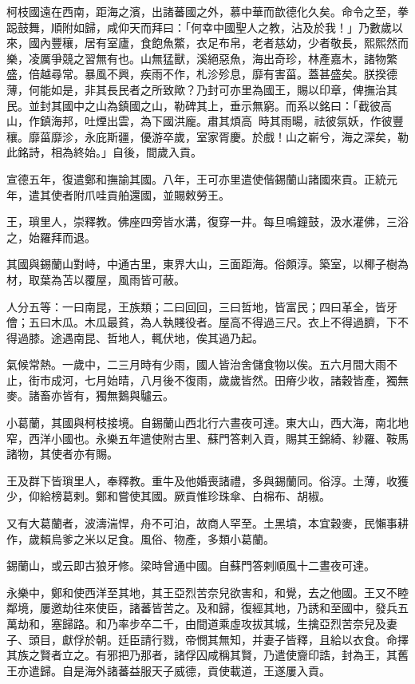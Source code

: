 \begin{pinyinscope}
柯枝國遠在西南，距海之濱，出諸蕃國之外，慕中華而歆德化久矣。命令之至，拳跽鼓舞，順附如歸，咸仰天而拜曰：「何幸中國聖人之教，沾及於我！」乃數歲以來，國內豐穰，居有室廬，食飽魚鱉，衣足布帛，老者慈幼，少者敬長，熙熙然而樂，凌厲爭競之習無有也。山無猛獸，溪絕惡魚，海出奇珍，林產嘉木，諸物繁盛，倍越尋常。暴風不興，疾雨不作，札沴殄息，靡有害菑。蓋甚盛矣。朕揆德薄，何能如是，非其長民者之所致歟？乃封可亦里為國王，賜以印章，俾撫治其民。並封其國中之山為鎮國之山，勒碑其上，垂示無窮。而系以銘曰：「截彼高山，作鎮海邦，吐煙出雲，為下國洪龐。肅其煩高，時其雨暘，祛彼氛妖，作彼豐穰。靡菑靡沴，永庇斯疆，優游卒歲，室家胥慶。於戲！山之嶄兮，海之深矣，勒此銘詩，相為終始。」自後，間歲入貢。

宣德五年，復遣鄭和撫諭其國。八年，王可亦里遣使偕錫蘭山諸國來貢。正統元年，遣其使者附爪哇貢舶還國，並賜敕勞王。

王，瑣里人，崇釋教。佛座四旁皆水溝，復穿一井。每旦鳴鐘鼓，汲水灌佛，三浴之，始羅拜而退。

其國與錫蘭山對峙，中通古里，東界大山，三面距海。俗頗淳。築室，以椰子樹為材，取葉為苫以覆屋，風雨皆可蔽。

人分五等：一曰南昆，王族類；二曰回回，三曰哲地，皆富民；四曰革全，皆牙儈；五曰木瓜。木瓜最貧，為人執賤役者。屋高不得過三尺。衣上不得過臍，下不得過膝。途遇南昆、哲地人，輒伏地，俟其過乃起。

氣候常熱。一歲中，二三月時有少雨，國人皆治舍儲食物以俟。五六月間大雨不止，街市成河，七月始晴，八月後不復雨，歲歲皆然。田瘠少收，諸穀皆產，獨無麥。諸畜亦皆有，獨無鵝與驢云。

小葛蘭，其國與柯枝接境。自錫蘭山西北行六晝夜可達。東大山，西大海，南北地窄，西洋小國也。永樂五年遣使附古里、蘇門答剌入貢，賜其王錦綺、紗羅、鞍馬諸物，其使者亦有賜。

王及群下皆瑣里人，奉釋教。重牛及他婚喪諸禮，多與錫蘭同。俗淳。土薄，收獲少，仰給榜葛剌。鄭和嘗使其國。厥貢惟珍珠傘、白棉布、胡椒。

又有大葛蘭者，波濤湍悍，舟不可泊，故商人罕至。土黑墳，本宜穀麥，民懶事耕作，歲賴烏爹之米以足食。風俗、物產，多類小葛蘭。

錫蘭山，或云即古狼牙修。梁時曾通中國。自蘇門答剌順風十二晝夜可達。

永樂中，鄭和使西洋至其地，其王亞烈苦奈兒欲害和，和覺，去之他國。王又不睦鄰境，屢邀劫往來使臣，諸蕃皆苦之。及和歸，復經其地，乃誘和至國中，發兵五萬劫和，塞歸路。和乃率步卒二千，由間道乘虛攻拔其城，生擒亞烈苦奈兒及妻子、頭目，獻俘於朝。廷臣請行戮，帝憫其無知，并妻子皆釋，且給以衣食。命擇其族之賢者立之。有邪把乃那者，諸俘囚咸稱其賢，乃遣使齎印誥，封為王，其舊王亦遣歸。自是海外諸蕃益服天子威德，貢使載道，王遂屢入貢。


\end{pinyinscope}
